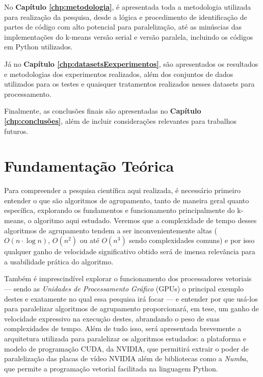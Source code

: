 \documentclass[12pt,
openright, 
oneside, %
a4paper,    %
brazil]{facom-ufu-abntex2}
\begin{document}
No \textbf{Capítulo \ref{chp:metodologia}}, é apresentada toda a metodologia utilizada para realização da pesquisa, desde a lógica e procedimento de identificação de partes de código com alto potencial para paralelização, até as minúscias das implementações do k-means versão serial e versão paralela, incluindo os códigos em Python utilizados.

Já no \textbf{Capítulo \ref{chp:datasetsEexperimentos}}, são apresentados os resultados e metodologias dos experimentos realizados, além dos conjuntos de dados utilizados para os testes e quaisquer tratamentos realizados nesses datasets para processamento.

Finalmente, as conclusões finais são apresentadas no \textbf{Capítulo \ref{chp:conclusões}}, além de incluir considerações relevantes para trabalhos futuros.





\chapter{Fundamentação Teórica}
\label{chp:fundamentaçãoTeórica}

Para compreender a pesquisa científica aqui realizada, é necessário primeiro entender o que são algoritmos de agrupamento, tanto de maneira geral quanto específica, explorando os fundamentos e funcionamento principalmente do k-means, o algoritmo aqui estudado. Veremos que a complexidade de tempo desses algoritmos de agrupamento tendem a ser inconvenientemente altas ($O(n\cdot\log{n})$, $O(n^2)$ ou até $O(n^3)$ sendo complexidades comuns) e por isso qualquer ganho de velocidade significativo obtido será de imensa relevância para a usabilidade prática do algoritmo.

Também é imprescindível explorar o funcionamento dos processadores vetoriais --- sendo as \textit{Unidades de Processamento Gráfico} (GPUs) o principal exemplo destes e exatamente no qual essa pesquisa irá focar --- e entender por que usá-los para paralelizar algoritmos de agrupamento proporcionará, em tese, um ganho de velocidade expressivo na execução destes, abrandando o peso de suas complexidades de tempo. Além de tudo isso, será apresentada brevemente a arquitetura utilizada para paralelizar os algoritmos estudados: a plataforma e modelo de programação CUDA, da NVIDIA, que permitirá extrair o poder de paralelização das placas de vídeo NVIDIA além de bibliotecas como a \textit{Numba}, que permite a programação vetorial facilitada na linguagem Python.
\end{document}
